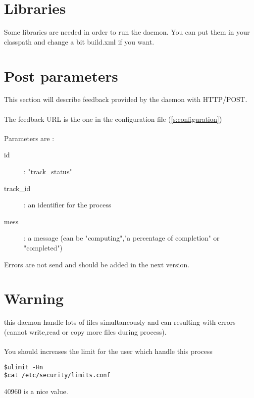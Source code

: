 \documentclass[11pt]{report}
\begin{document}
\section{Libraries}\label{s:libs}
Some libraries are needed in order to run the daemon.
You can put them in your classpath and change a bit build.xml if you want.
\section{Post parameters}\label{s:post}
This section will describe feedback provided by the daemon with HTTP/POST.\\\\
The feedback URL is the one in the configuration file (\ref{s:configuration})\\\\
Parameters are :
 \begin{description}
		\item[id] : "track\_status"
		\item[track\_id] : an identifier for the process
		\item[mess] : a message (can be "computing","a percentage of completion" or "completed") 
\end{description}

Errors are not send and should be added in the next version.

\section{Warning}\label{s:warning}
this daemon handle lots of files simultaneously and can resulting with errors (cannot write,read or copy more files during process).\\\\
 You should increases the limit for the user which handle this process 
\begin{verbatim}
$ulimit -Hn
$cat /etc/security/limits.conf
\end{verbatim}
40960 is a nice value.
\end{document}
